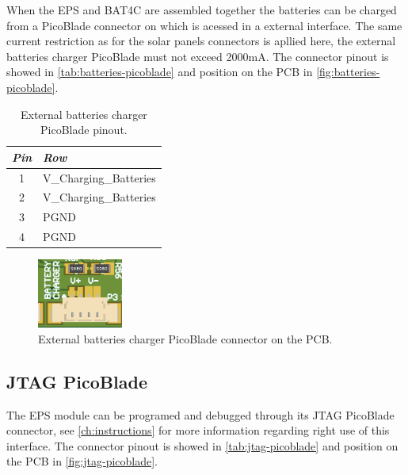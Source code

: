 When the EPS and BAT4C are assembled together the batteries can be charged from a PicoBlade connector on which is acessed in a external interface. The same current restriction as for the solar panels connectors is apllied here, the external batteries charger PicoBlade must not exceed 2000mA. The connector pinout is showed in \autoref{tab:batteries-picoblade} and position on the PCB in \autoref{fig:batteries-picoblade}.

\begin{table}[!h]
    \centering
    \begin{tabular}{cl}
        \toprule[1.5pt]
        \textit{Pin} & \textit{Row} \\
        \midrule
        1            & V\_Charging\_Batteries \\
        2            & V\_Charging\_Batteries \\
        3            & PGND \\
        4            & PGND \\
        \bottomrule[1.5pt]
    \end{tabular}
    \caption{External batteries charger PicoBlade pinout.}
    \label{tab:batteries-picoblade}
\end{table}

\begin{figure}[!ht]
    \begin{center}
        \includegraphics[width=0.25\textwidth]{figures/battery-charger-picoblade-3d.png}
        \caption{External batteries charger PicoBlade connector on the PCB.}
        \label{fig:batteries-picoblade}
    \end{center}
\end{figure}

\subsection{JTAG PicoBlade} \label{jtag-picoblade}

The EPS module can be programed and debugged through its JTAG PicoBlade connector, see \autoref{ch:instructions} for more information regarding right use of this interface. The connector pinout is showed in \autoref{tab:jtag-picoblade} and position on the PCB in \autoref{fig:jtag-picoblade}.

